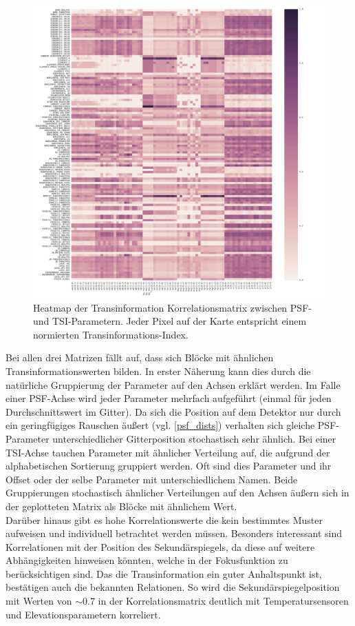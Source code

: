 \begin{figure}[H]
	\centering
	\includegraphics[scale=.42]{heatmaps/psf_tsi.pdf}
	\caption[Heatmap der Transinformation Korrelationsmatrix zwischen PSF- und TSI-Parametern]{Heatmap der Transinformation Korrelationsmatrix zwischen PSF- und TSI-Parametern. Jeder Pixel auf der Karte entspricht einem normierten Transinformations-Index.}
    \label{heatmap_psf_tsi_inline}
\end{figure}

Bei allen drei Matrizen fällt auf, dass sich Blöcke mit ähnlichen Transinformationswerten bilden. In erster Näherung kann dies durch die natürliche Gruppierung der Parameter auf den Achsen erklärt werden. Im Falle einer PSF-Achse wird jeder Parameter mehrfach aufgeführt (einmal für jeden Durchschnittswert im Gitter). Da sich die Position auf dem Detektor nur durch ein geringfügiges Rauschen äußert (vgl. \ref{psf_dists}) verhalten sich gleiche PSF-Parameter unterschiedlicher Gitterposition stochastisch sehr ähnlich. Bei einer TSI-Achse tauchen Parameter mit ähnlicher Verteilung auf, die aufgrund der alphabetischen Sortierung gruppiert werden. Oft sind dies Parameter und ihr Offset oder der selbe Parameter mit unterschiedlichem Namen. Beide Gruppierungen stochastisch ähnlicher Verteilungen auf den Achsen äußern sich in der geplotteten Matrix als Blöcke mit ähnlichem Wert.\\
Darüber hinaus gibt es hohe Korrelationswerte die kein bestimmtes Muster aufweisen und individuell betrachtet werden müssen. Besonders interessant sind Korrelationen mit der Position des Sekundärspiegels, da diese auf weitere Abhängigkeiten hinweisen könnten, welche in der Fokusfunktion zu berücksichtigen sind. Das die Transinformation ein guter Anhaltspunkt ist, bestätigen auch die bekannten Relationen. So wird die Sekundärspiegelposition mit Werten von $\sim\num{0.7}$ in der Korrelationsmatrix deutlich mit Temperatursensoren und Elevationsparametern korreliert.

